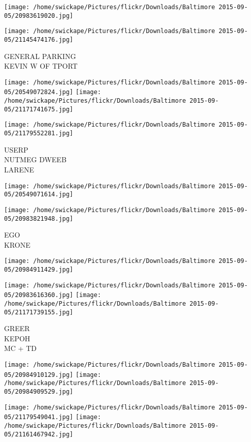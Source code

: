 \documentclass[10pt,letterpaper]{article}
\begin{document}
\texttt{[image: /home/swickape/Pictures/flickr/Downloads/Baltimore 2015-09-05/20983619020.jpg]}

\vspace{0.25in}
\texttt{[image: /home/swickape/Pictures/flickr/Downloads/Baltimore 2015-09-05/21145474176.jpg]}

GENERAL PARKING\\
KEVIN W OF TPORT
\pagebreak

\texttt{[image: /home/swickape/Pictures/flickr/Downloads/Baltimore 2015-09-05/20549072824.jpg]}
\texttt{[image: /home/swickape/Pictures/flickr/Downloads/Baltimore 2015-09-05/21171741675.jpg]}

\vspace{0.25in}
\texttt{[image: /home/swickape/Pictures/flickr/Downloads/Baltimore 2015-09-05/21179552281.jpg]}

USERP\\
NUTMEG DWEEB\\
LARENE
\pagebreak

\texttt{[image: /home/swickape/Pictures/flickr/Downloads/Baltimore 2015-09-05/20549071614.jpg]}

\vspace{0.25in}
\texttt{[image: /home/swickape/Pictures/flickr/Downloads/Baltimore 2015-09-05/20983821948.jpg]}

EGO\\
KRONE
\pagebreak

\texttt{[image: /home/swickape/Pictures/flickr/Downloads/Baltimore 2015-09-05/20984911429.jpg]}

\vspace{0.25in}
\texttt{[image: /home/swickape/Pictures/flickr/Downloads/Baltimore 2015-09-05/20983616360.jpg]}
\texttt{[image: /home/swickape/Pictures/flickr/Downloads/Baltimore 2015-09-05/21171739155.jpg]}

GREER\\
KEPOH\\
MC + TD
\pagebreak

\texttt{[image: /home/swickape/Pictures/flickr/Downloads/Baltimore 2015-09-05/20984910129.jpg]}
\texttt{[image: /home/swickape/Pictures/flickr/Downloads/Baltimore 2015-09-05/20984909529.jpg]}

\texttt{[image: /home/swickape/Pictures/flickr/Downloads/Baltimore 2015-09-05/21179549041.jpg]}
\texttt{[image: /home/swickape/Pictures/flickr/Downloads/Baltimore 2015-09-05/21161467942.jpg]}
\end{document}
